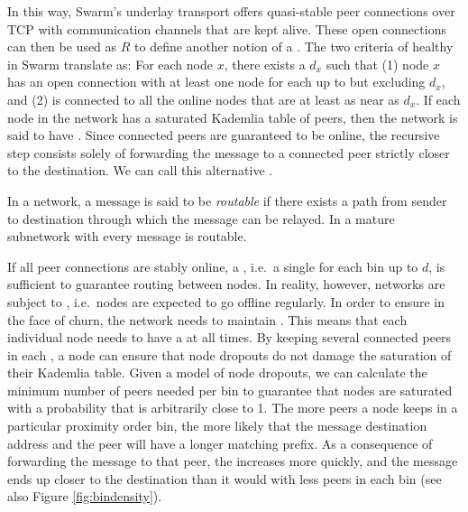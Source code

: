 In this way, Swarm's underlay transport offers quasi-stable peer connections over TCP with communication channels that are kept alive. These open connections can then be used as $R$ to define another notion of a . The two criteria of healthy  in Swarm translate as: For each node $x$, there exists a  $d_x$ such that (1) node $x$ has an open connection with at least one node for each  up to but excluding $d_x$, and (2) is connected to all the online nodes that are at least as near as $d_x$. If each node in the network has a saturated Kademlia table of peers, then the network is said to have . Since connected peers are guaranteed to be online, the recursive step consists solely of forwarding the message to a connected peer strictly closer to the destination. We can call this alternative .


In a  network, a message is said to be \emph{routable} if there exists a path from sender to destination through which the message can be relayed. In a mature subnetwork with  every message is routable. 

If all peer connections are stably online, a , i.e.\ a single  for each bin up to $d$, is sufficient to guarantee routing between nodes. In reality, however, networks are subject to , i.e.\ nodes are expected to go offline regularly. In order to ensure  in the face of churn, the network needs to maintain . This means that each individual node needs to have a  at all times. By keeping several connected peers in each , a node can ensure that node dropouts do not damage the saturation of their Kademlia table. Given a model of node dropouts, we can calculate the minimum number of peers needed per bin to guarantee that nodes are saturated with a probability that is arbitrarily close to 1. The more peers a node keeps in a particular proximity order bin, the more likely that the message destination address and the peer will have a longer matching prefix. As a consequence of forwarding the message to that peer, the  increases more quickly, and the message ends up closer to the destination than it would with less peers in each bin (see also Figure \ref{fig:bindensity}).



